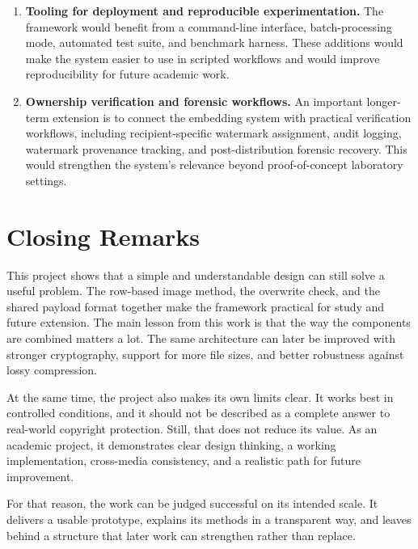 \begin{enumerate}[label=\textbf{F\arabic*.}]
    \item \textbf{Tooling for deployment and reproducible experimentation.} The framework would benefit from a command-line interface, batch-processing mode, automated test suite, and benchmark harness. These additions would make the system easier to use in scripted workflows and would improve reproducibility for future academic work.
    \item \textbf{Ownership verification and forensic workflows.} An important longer-term extension is to connect the embedding system with practical verification workflows, including recipient-specific watermark assignment, audit logging, watermark provenance tracking, and post-distribution forensic recovery. This would strengthen the system's relevance beyond proof-of-concept laboratory settings.
\end{enumerate}

\section{Closing Remarks}

This project shows that a simple and understandable design can still solve a useful problem. The row-based image method, the overwrite check, and the shared payload format together make the framework practical for study and future extension. The main lesson from this work is that the way the components are combined matters a lot. The same architecture can later be improved with stronger cryptography, support for more file sizes, and better robustness against lossy compression.

At the same time, the project also makes its own limits clear. It works best in controlled conditions, and it should not be described as a complete answer to real-world copyright protection. Still, that does not reduce its value. As an academic project, it demonstrates clear design thinking, a working implementation, cross-media consistency, and a realistic path for future improvement.

For that reason, the work can be judged successful on its intended scale. It delivers a usable prototype, explains its methods in a transparent way, and leaves behind a structure that later work can strengthen rather than replace.
